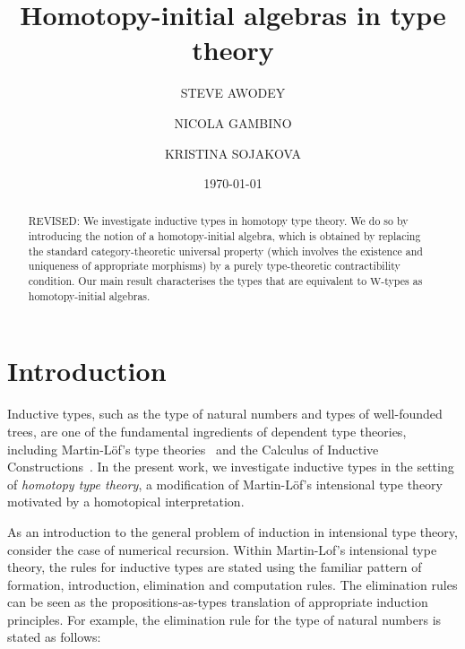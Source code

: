 \documentclass[10pt,a4paper,oneside,reqno]{amsart}
\numberwithin{equation}{section}
\theoremstyle{mythm}
\theoremstyle{mydef}
\theoremstyle{myrmk}
\newcommand{\W}{\mathrm{W}}
\begin{document}
\title[]{Homotopy-initial algebras in type theory}
\author[S. Awodey]{STEVE AWODEY}
\address{Steve Awodey, Department of Philosophy 
Carnegie Mellon University 
Pittsburgh, PA  15213, USA}
\author[N. Gambino]{NICOLA GAMBINO}
\address{Nicola Gambino, School of Mathematics, University of Leeds, Leeds LS2 9JT, UK}
\author[K. Sojakova]{KRISTINA SOJAKOVA}
\address{Kristina Sojakova, Department of Computer Science, Carnegie Mellon University, Pittsburgh, PA 15213, USA}
\date{\today}


\begin{abstract}
REVISED: We investigate inductive types in homotopy type theory. We do so by introducing the 
notion of a homotopy-initial algebra, which is obtained by replacing the standard category-theoretic universal property 
(which involves the existence and uniqueness of appropriate morphisms) by a purely type-theoretic contractibility condition. 
Our main result characterises the types that are equivalent to $\W$-types as homotopy-initial algebras. 
\end{abstract}


\maketitle

\newcommand{\Nat}{\mathbb{N}}
\newcommand{\natrec}{\mathsf{rec}}
\newcommand{\natelim}{\mathsf{elim}}



\section*{Introduction}

Inductive types, such as the type of natural numbers and types of well-founded trees,  are one of the fundamental ingredients of dependent type theories, including  Martin-L\"of's type theories~\cite{NordstromB:marltt} and the Calculus of Inductive Constructions~\cite{BertotY:inttpp,CoquandT:inddt}. In the present work, we investigate inductive types in the setting of \emph{homotopy type theory}, a  modification of Martin-L\"of's intensional type theory motivated by a homotopical interpretation. 

As an introduction to the general problem of induction in intensional type theory, consider the case of numerical recursion.  Within Martin-Lof's intensional type theory, the rules for inductive types are stated using the familiar pattern of formation, introduction, elimination and computation rules.  The elimination rules can be seen as the propositions-as-types translation of appropriate induction principles. For example, the elimination rule for the type of natural numbers is stated as follows:
\end{document}

